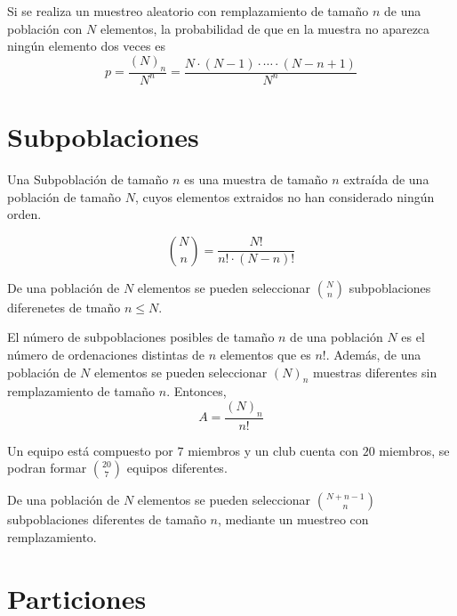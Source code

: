 \begin{theo}
  Si se realiza un muestreo aleatorio con remplazamiento de tamaño $n$ de una población con $N$ elementos, la probabilidad de que en la muestra no aparezca ningún elemento dos veces es 
  \[ 
    p = \frac{(N)_{n}}{N^{n}} = \frac{N \cdot (N -1) \cdot \cdots \cdot (N-n+1)}{N^{n}} 
  \] 
\end{theo}

\section{Subpoblaciones}

\begin{defn}[Subpoblación]
  Una Subpoblación de tamaño $n$ es  una muestra de tamaño $n$ extraída de una población de tamaño $N$, cuyos elementos extraidos no han considerado ningún orden.
\end{defn}

\begin{nota}
  \[
    \binom{N}{n} = \frac{N!}{n! \cdot (N-n)!}
  \]
\end{nota}

\begin{theo}
  De una población de $N$ elementos se pueden seleccionar $\binom{N}{n}$ subpoblaciones diferenetes de tmaño $n \leq N$.
\end{theo}

\begin{dem}
  El número de subpoblaciones posibles de tamaño $n$ de una población $N$ es el número de ordenaciones distintas de $n$ elementos que es $n!$. Además, de una población de $N$ elementos se pueden seleccionar $(N)_{n}$ muestras diferentes sin remplazamiento de tamaño $n$. Entonces,
  \[ 
    A = \frac{(N)_{n}}{n!}
  \] 
\end{dem}

\begin{ejm}
  Un equipo está compuesto por $7$ miembros y un club cuenta con $20$ miembros, se podran formar $\binom{20}{7}$ equipos diferentes.
\end{ejm}

\begin{theo}
  De una población de $N$ elementos se pueden seleccionar $\binom{N + n -1}{n}$ subpoblaciones diferentes de tamaño $n$, mediante un muestreo con remplazamiento.
\end{theo}

\section{Particiones}

